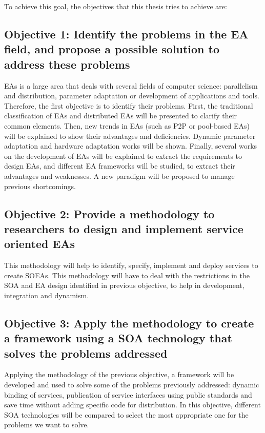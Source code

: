 To achieve this goal, the objectives that this thesis tries to achieve are:

\subsection*{Objective 1: Identify the problems in the EA field, and propose a possible solution to address these problems}
\label{subsec:intro:obj:problems}
EAs is a large area that deals with several fields of computer science: parallelism and distribution, parameter adaptation or development of applications and tools. Therefore, the first objective is to identify their problems. First, the traditional classification of EAs and distributed EAs will be presented to clarify their common elements. Then, new trends in EAs (such as P2P or pool-based EAs) will be explained to show their advantages and deficiencies. Dynamic parameter adaptation and hardware adaptation works will be shown. Finally, several works on the development of EAs will be explained to extract the requirements to design EAs, and different EA frameworks will be studied, to extract their advantages and weaknesses. A new paradigm will be proposed to manage previous shortcomings.

\subsection*{Objective 2: Provide a methodology to researchers to design and implement service oriented EAs} 
\label{subsec:intro:obj:methodology}
This methodology will help to identify, specify, implement and deploy services to create SOEAs. This methodology will have to deal with the restrictions in the SOA and EA design identified in previous objective, to help in development, integration and dynamism.

\subsection*{Objective 3: Apply the methodology to create a framework using a SOA technology that solves the problems addressed}
\label{subsec:intro:obj:fwork}
Applying the methodology of the previous objective, a framework will be developed and used to solve some of the problems previously addressed: dynamic binding of services, publication of service interfaces using public standards and save time without adding specific code for distribution. In this objective, different SOA technologies will be compared to select the most appropriate one for the problems we want to solve.

